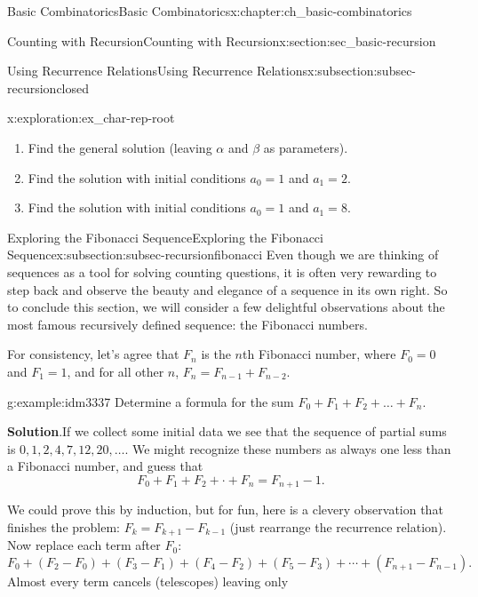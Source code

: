 \documentclass[oneside,10pt,]{book}
\numberwithin{equation}{chapter}
\begin{document}
\begin{chapterptx}{Basic Combinatorics}{}{Basic Combinatorics}{}{}{x:chapter:ch_basic-combinatorics}
\begin{sectionptx}{Counting with Recursion}{}{Counting with Recursion}{}{}{x:section:sec_basic-recursion}
\begin{subsectionptx}{Using Recurrence Relations}{}{Using Recurrence Relations}{}{}{x:subsection:subsec-recursionclosed}
\begin{exploration}{}{x:exploration:ex_char-rep-root}
\begin{enumerate}[font=\bfseries,label=(\alph*),ref=\alph*]
\item{}Find the general solution (leaving \(\alpha\) and \(\beta\) as parameters).%
\item{}Find the solution with initial conditions \(a_0 = 1\) and \(a_1 = 2\).%
\item{}Find the solution with initial conditions \(a_0 = 1\) and \(a_1 = 8\).%
\end{enumerate}
\end{exploration}
\end{subsectionptx}
%
%
\typeout{************************************************}
\typeout{************************************************}
%
\begin{subsectionptx}{Exploring the Fibonacci Sequence}{}{Exploring the Fibonacci Sequence}{}{}{x:subsection:subsec-recursionfibonacci}
Even though we are thinking of sequences as a tool for solving counting questions, it is often very rewarding to step back and observe the beauty and elegance of a sequence in its own right.  So to conclude this section, we will consider a few delightful observations about the most famous recursively defined sequence: the Fibonacci numbers.%
\par
For consistency, let's agree that \(F_n\) is the \(n\)th Fibonacci number, where \(F_0 = 0\) and \(F_1 = 1\), and for all other \(n\), \(F_n = F_{n-1} + F_{n-2}\).%
\begin{example}{}{g:example:idm3337}%
Determine a formula for the sum \(F_{0} + F_{1} + F_{2} + \ldots + F_{n}\).%
\par\smallskip%
\noindent\textbf{Solution}.\hypertarget{g:solution:idm3341}{}\quad{}If we collect some initial data we see that the sequence of partial sums is \(0, 1, 2, 4, 7, 12, 20, \ldots\).  We might recognize these numbers as always one less than a Fibonacci number, and guess that%
\begin{equation*}
F_0 + F_1 + F_2 + \cdot + F_n = F_{n+1} - 1.
\end{equation*}
%
\par
We could prove this by induction, but for fun, here is a clevery observation that finishes the problem: \(F_k = F_{k+1} - F_{k-1}\) (just rearrange the recurrence relation).  Now replace each term after \(F_0\):%
\begin{equation*}
F_0 + (F_2 - F_0) + (F_3 - F_1) + (F_4 - F_2) + (F_5 - F_3) + \cdots + (F_{n+1} - F_{n-1})\text{.}
\end{equation*}
Almost every term cancels (telescopes) leaving only%

\end{example}
\end{subsectionptx}
\end{sectionptx}
\end{chapterptx}
\end{document}

